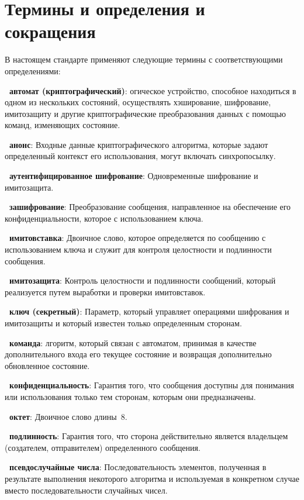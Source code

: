 \chapter{Термины и определения и сокращения}

В настоящем стандарте применяют
следующие термины с соответствующими определениями:

{\bf \thedefctr~автомат (криптографический)}:
огическое устройство, способное находиться в одном из нескольких 
состояний, осуществлять хэширование, шифрование, имитозащиту и другие 
криптографические преобразования данных с помощью команд, изменяющих 
состояние.

{\bf \thedefctr~анонс}:
Входные данные криптографического алгоритма,
которые задают определенный контекст его использования,
могут включать синхропосылку.

{\bf \thedefctr~аутентифицированное шифрование}:
Одновременные шифрование и имитозащита.

{\bf \thedefctr~зашифрование}:
Преобразование сообщения,
направленное на обеспечение его конфиденциальности,
которое  с использованием ключа.

{\bf \thedefctr~имитовставка}:
Двоичное слово, 
которое определяется по сообщению с использованием ключа 
и служит для контроля целостности и подлинности сообщения.

{\bf \thedefctr~имитозащита}:
Контроль целостности и подлинности сообщений, 
который реализуется путем выработки и проверки имитовставок.

{\bf \thedefctr~ключ (секретный)}:
Параметр, который управляет операциями шифрования 
и имитозащиты и который известен только определенным сторонам.

{\bf \thedefctr~команда}:
лгоритм, который связан с автоматом, принимая 
в качестве дополнительного входа его текущее состояние
и возвращая дополнительно обновленное состояние.

{\bf \thedefctr~конфиденциальность}:
Гарантия того, что сообщения доступны для понимания или использования
только тем сторонам, которым они предназначены.

{\bf \thedefctr~октет}:
Двоичное слово длины~$8$.

{\bf \thedefctr~подлинность}:
Гарантия того, что сторона действительно является
владельцем (создателем, отправителем) определенного сообщения.

{\bf \thedefctr~псевдослучайные числа}: 
Последовательность элементов, полученная в результате выполнения некоторого
алгоритма и используемая в конкретном случае вместо последовательности случайных
чисел.

